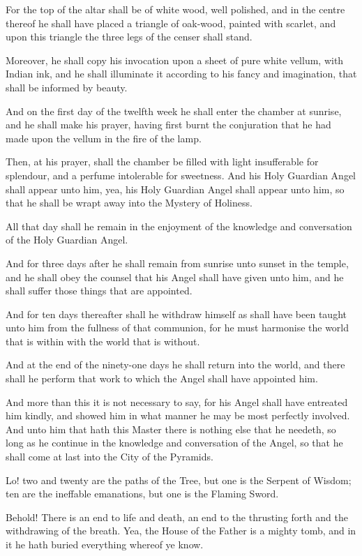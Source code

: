 For the top of the altar shall be of white wood, well polished, and in the centre thereof he shall have placed a triangle of oak-wood, painted with scarlet, and upon this triangle the three legs of the censer shall stand.

Moreover, he shall copy his invocation upon a sheet of pure white vellum, with Indian ink, and he shall illuminate it according to his fancy and imagination, that shall be informed by beauty.

And on the first day of the twelfth week he shall enter the chamber at sunrise, and he shall make his prayer, having first burnt the conjuration that he had made upon the vellum in the fire of the lamp.

Then, at his prayer, shall the chamber be filled with light insufferable for splendour, and a perfume intolerable for sweetness. And his Holy Guardian Angel shall appear unto him, yea, his Holy Guardian Angel shall appear unto him, so that he shall be wrapt away into the Mystery of Holiness.

All that day shall he remain in the enjoyment of the knowledge and conversation of the Holy Guardian Angel.

And for three days after he shall remain from sunrise unto sunset in the temple, and he shall obey the counsel that his Angel shall have given unto him, and he shall suffer those things that are appointed.

And for ten days thereafter shall he withdraw himself as shall have been taught unto him from the fullness of that communion, for he must harmonise the world that is within with the world that is without.

And at the end of the ninety-one days he shall return into the world, and there shall he perform that work to which the Angel shall have appointed him.

And more than this it is not necessary to say, for his Angel shall have entreated him kindly, and showed him in what manner he may be most perfectly involved. And unto him that hath this Master there is nothing else that he needeth, so long as he continue in the knowledge and conversation of the Angel, so that he shall come at last into the City of the Pyramids.




Lo! two and twenty are the paths of the Tree, but one is the Serpent of Wisdom; ten are the ineffable emanations, but one is the Flaming Sword.

Behold! There is an end to life and death, an end to the thrusting forth and the withdrawing of the breath. Yea, the House of the Father is a mighty tomb, and in it he hath buried everything whereof ye know.

